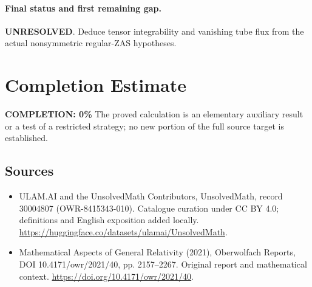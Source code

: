 \documentclass[11pt]{article}
\begin{document}
\paragraph{Final status and first remaining gap.}
\textbf{UNRESOLVED}. Deduce tensor integrability and vanishing tube flux from the actual nonsymmetric regular-ZAS hypotheses.

\section{Completion Estimate}
\noindent\textbf{COMPLETION: 0\%}
The proved calculation is an elementary auxiliary result or a test of a restricted strategy; no new portion of the full source target is established.

\subsection{Sources}
\begin{itemize}
\item[\hypertarget{source:30004807:1}{S1}] ULAM.AI and the UnsolvedMath Contributors, UnsolvedMath, record 30004807 (OWR-8415343-010). Catalogue curation under CC BY 4.0; definitions and English exposition added locally.
\url{https://huggingface.co/datasets/ulamai/UnsolvedMath}.
\item[\hypertarget{source:30004807:2}{S2}] Mathematical Aspects of General Relativity (2021), Oberwolfach Reports, DOI 10.4171/owr/2021/40, pp. 2157--2267. Original report and mathematical context.
\url{https://doi.org/10.4171/owr/2021/40}.
\end{itemize}
\label{end:30004807}
\end{document}
